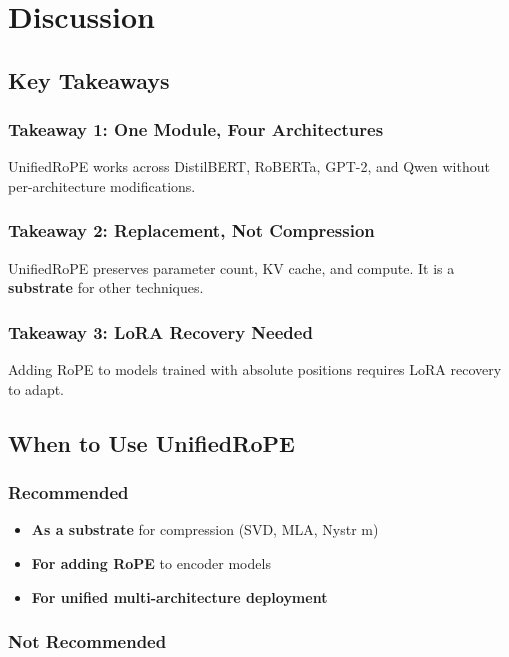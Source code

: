 
\section{Discussion}

\subsection{Key Takeaways}

\subsubsection{Takeaway 1: One Module, Four Architectures}

UnifiedRoPE works across DistilBERT, RoBERTa, GPT-2, and Qwen without 
per-architecture modifications.

\subsubsection{Takeaway 2: Replacement, Not Compression}

UnifiedRoPE preserves parameter count, KV cache, and compute. It is a 
\textbf{substrate} for other techniques.

\subsubsection{Takeaway 3: LoRA Recovery Needed}

Adding RoPE to models trained with absolute positions requires LoRA 
recovery to adapt.

\subsection{When to Use UnifiedRoPE}

\subsubsection{Recommended}

\begin{itemize}
\item \textbf{As a substrate} for compression (SVD, MLA, Nystr m)
\item \textbf{For adding RoPE} to encoder models
\item \textbf{For unified multi-architecture deployment}

\end{itemize}
\subsubsection{Not Recommended}

